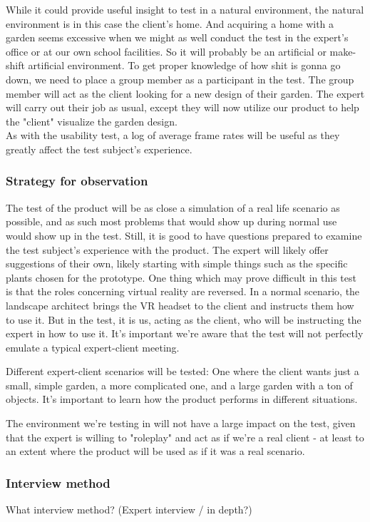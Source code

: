 While it could provide useful insight to test in a natural environment, the natural environment is in this case the client's home. And acquiring a home with a garden seems excessive when we might as well conduct the test in the expert's office or at our own school facilities. So it will probably be an artificial or make-shift artificial environment. To get proper knowledge of how shit is gonna go down, we need to place a group member as a participant in the test. The group member will act as the client looking for a new design of their garden. The expert will carry out their job as usual, except they will now utilize our product to help the "client" visualize the garden design.\\
As with the usability test, a log of average frame rates will be useful as they greatly affect the test subject's experience. 

\subsubsection{Strategy for observation}
The test of the product will be as close a simulation of a real life scenario as possible, and as such most problems that would show up during normal use would show up in the test. Still, it is good to have questions prepared to examine the test subject's experience with the product. The expert will likely offer suggestions of their own, likely starting with simple things such as the specific plants chosen for the prototype. 
One thing which may prove difficult in this test is that the roles concerning virtual reality are reversed. In a normal scenario, the landscape architect brings the VR headset to the client and instructs them how to use it. But in the test, it is us, acting as the client, who will be instructing the expert in how to use it. It's important we're aware that the test will not perfectly emulate a typical expert-client meeting. 

Different expert-client scenarios will be tested: One where the client wants just a small, simple garden, a more complicated one, and a large garden with a ton of objects. It's important to learn how the product performs in different situations. 

The environment we're testing in will not have a large impact on the test, given that the expert is willing to "roleplay" and act as if we're a real client - at least to an extent where the product will be used as if it was a real scenario. 


\subsubsection{Interview method}
What interview method? (Expert interview / in depth?)

